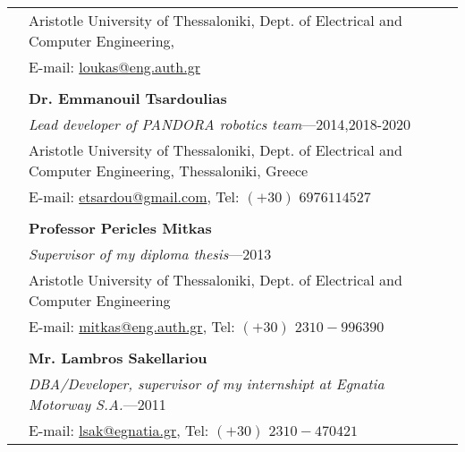 \documentclass[a4paper,10pt,twoside]{article}
\begin{document}
\begin{tabular}{rp{14cm}}
&Aristotle University of Thessaloniki, Dept. of Electrical and Computer Engineering,\\
& E-mail: \href{mailto: loukas@eng.auth.gr}{loukas@eng.auth.gr} \\
&\\
& \textbf{Dr. Emmanouil Tsardoulias}\\
& \textit{Lead developer of PANDORA robotics team}---2014,2018-2020\\
&Aristotle University of Thessaloniki, Dept. of Electrical and Computer Engineering, Thessaloniki, Greece \\
& E-mail: \href{mailto: etsardou@gmail.com}{etsardou@gmail.com}, Tel: $(+30)$ $697 611 4527$ \\
&\\
& \textbf{Professor Pericles Mitkas}\\
& \textit{Supervisor of my diploma thesis}---2013\\
&Aristotle University of Thessaloniki, Dept. of Electrical and Computer Engineering\\
& E-mail: \href{mailto: mitkas@eng.auth.gr}{mitkas@eng.auth.gr}, Tel: $(+30)$ $2310-996390$ \\
&\\
& \textbf{Mr. Lambros Sakellariou}\\
& \textit{DBA/Developer, supervisor of my internshipt at Egnatia Motorway S.A.}---2011\\
& E-mail: \href{mailto: lsak@egnatia.gr}{lsak@egnatia.gr}, Tel: $(+30)$ $2310 - 470421$ \\

\end{tabular}
\newpage
\end{document}
